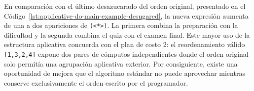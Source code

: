 En comparación con el último desazucarado del orden original, presentado en el Código~\ref{lst:applicative-do-main-example-desugared}, la nueva expresión aumenta de una a dos apariciones de \verb|(<*>)|. La primera combina la preparación con la dificultad y la segunda combina el quiz con el examen final. Este mayor uso de la estructura aplicativa concuerda con el plan de costo 2: el reordenamiento válido \texttt{[1,3,2,4]} expone dos pares de cómputos independientes donde el orden original solo permitía una agrupación aplicativa exterior. Por consiguiente, existe una oportunidad de mejora que el algoritmo estándar no puede aprovechar mientras conserve exclusivamente el orden escrito por el programador.

